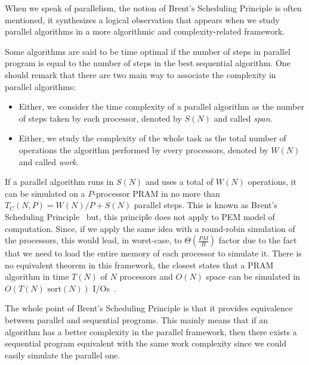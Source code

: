 {
When we speak of parallelism, the notion of Brent's Scheduling Principle is often mentioned, it synthesizes a logical observation that appears when we study parallel algorithms in a more algorithmic and complexity-related framework.

Some algorithms are said to be time optimal if the number of steps in parallel program is equal to the number of steps in the best sequential algorithm. One should remark that there are two main way to associate the complexity in parallel algorithms:

\begin{itemize}
    \item Either, we consider the time complexity of a parallel algorithm as the number of steps taken by each processor, denoted by $S(N)$ and called \textit{span}.
    \item Either, we study the complexity of the whole task as the total number of operations the algorithm performed by every processors, denoted by $W(N)$ and called \textit{work}.
\end{itemize}

If a parallel algorithm runs in $S(N)$ and uses a total of $W(N)$ operations, it can be simulated on a $P$-processor PRAM
in no more than $T_{C}(N, P) = W(N)/P + S(N)$ parallel steps. This is known as Brent's Scheduling Principle~\cite{gibbons1989more} but, this principle does not apply to PEM model of computation. Since, if we apply the same idea with a round-robin simulation of the processors, this would lead, in worst-case, to $\Theta(\frac{PM}{B})$ factor due to the fact that we need to load the entire memory of each processor to simulate it. There is no equivalent theorem in this framework, the closest states that a PRAM algorithm in time $T(N)$ of $N$ processors and $O(N)$ space can be simulated in $O(T(N) \text{ sort}(N))$ I/Os~\cite{chiang1995external}.

The whole point of Brent's Scheduling Principle is that it provides equivalence between parallel and sequential programs. This mainly means that if an algorithm has a better complexity in the parallel framework, then there exists a sequential program equivalent with the same work complexity since we could easily simulate the parallel one.

}

